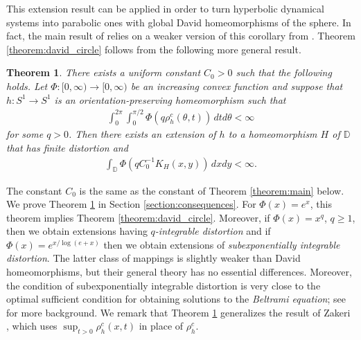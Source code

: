 \documentclass{amsart}
\theoremstyle{plain}
\newtheorem{theorem}{Theorem}
\theoremstyle{definition}
\theoremstyle{remark}
\numberwithin{equation}{section}
\numberwithin{theorem}{section}
\numberwithin{conjecture}{section}
\newcommand{\D}{\mathbb D}
\newcommand{\1}{\mathbf 1}
\begin{document}
This extension result can be applied in order to turn hyperbolic dynamical systems into parabolic ones with global David homeomorphisms of the sphere. In fact, the main result of \cite{LyubichMerenkovMukherjeeNtalampekos:David} relies on a weaker version of this corollary from \cite{Zakeri:boundary}. Theorem \ref{theorem:david_circle} follows from the following more general result.

\begin{theorem}\label{theorem:convex_circle}
There exists a uniform constant $C_0>0$ such that the following holds. Let $\Phi\colon [0,\infty)\to [0,\infty)$ be an increasing convex function and suppose that $h\colon S^1\to S^1$ is an orientation-preserving homeomorphism such that
\begin{align*}
\int_0^{2\pi} \int_0^{\pi/2} \Phi({q \rho_h^c(\theta,t)}) \, dtd\theta <\infty
\end{align*}
for some $q>0$. Then there exists an extension of $h$ to a homeomorphism $H$ of $\D$ that has finite distortion and 
\begin{align*}
\int_{\D} \Phi( qC_0^{-1}K_H(x,y)) \, dxdy<\infty.
\end{align*}
\end{theorem}

The constant $C_0$ is the same as the constant of Theorem \ref{theorem:main} below. We prove Theorem \ref{theorem:convex_circle} in Section \ref{section:consequences}. For $\Phi(x)=e^x$, this theorem implies Theorem \ref{theorem:david_circle}. Moreover, if $\Phi(x)=x^q$, $q\geq 1$, then we obtain extensions having \textit{$q$-integrable distortion} and if $\Phi(x)=e^{x/\log(e+x)}$ then we obtain extensions of \textit{subexponentially integrable distortion}. The latter class of mappings is slightly weaker than David homeomorphisms, but their general theory has no essential differences. Moreover, the condition of subexponentially integrable distortion is very close to the optimal sufficient condition for obtaining solutions to the \textit{Beltrami equation}; see \cite[Section 20.5, p.~570]{AstalaIwaniecMartin:quasiconformal} for more background. We remark that Theorem \ref{theorem:convex_circle} generalizes the result of Zakeri \cite[Theorem B]{Zakeri:boundary}, which uses $\sup_{t>0} \rho_h^c(x,t)$ in place of $\rho_h^c$.
\end{document}
